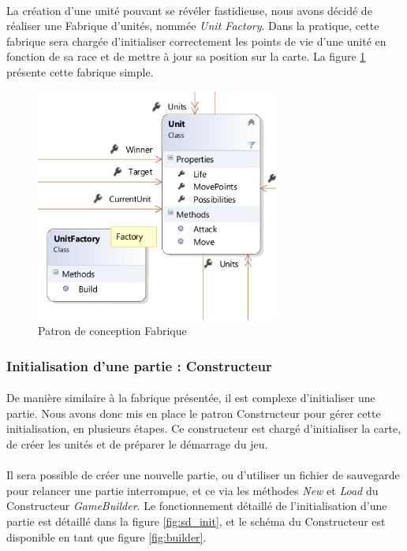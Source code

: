 \paragraph{}
La création d'une unité pouvant se révéler fastidieuse, nous avons décidé de réaliser une Fabrique d'unités, nommée \emph{Unit Factory}.
Dans la pratique, cette fabrique sera chargée d'initialiser correctement les points de vie d'une unité en fonction de sa race et de mettre à jour sa position sur la carte.
La figure \ref{fig:factory} présente cette fabrique simple.

\begin{figure}[h]
  \centering
  \includegraphics[width=8cm]{schemas/dp_factory.png}
  \caption{Patron de conception Fabrique}
  \label{fig:factory}
\end{figure}

\subsubsection{Initialisation d'une partie : Constructeur}

\paragraph{}
De manière similaire à la fabrique présentée, il est complexe d'initialiser une partie.
Nous avons donc mis en place le patron Constructeur pour gérer cette initialisation, en plusieurs étapes.
Ce constructeur est chargé d'initialiser la carte, de créer les unités et de préparer le démarrage du jeu.

\paragraph{}
Il sera possible de créer une nouvelle partie, ou d'utiliser un fichier de sauvegarde pour relancer une partie interrompue, et ce via les méthodes \emph{New} et \emph{Load} du Constructeur \emph{GameBuilder}.
Le fonctionnement détaillé de l'initialisation d'une partie est détaillé dans la figure \ref{fig:sd_init}, et le schéma du Constructeur est disponible en tant que figure \ref{fig:builder}.

